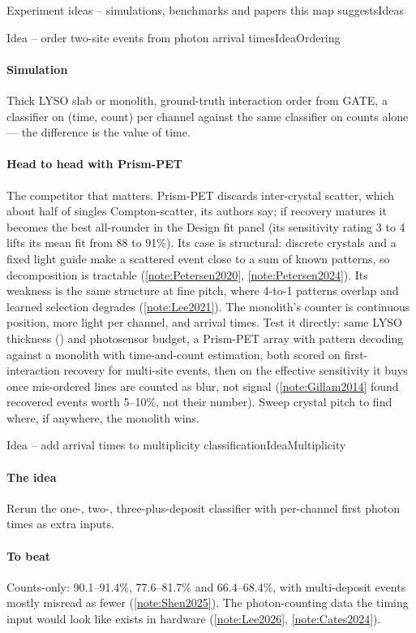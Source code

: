 \begin{programnote}{Experiment ideas -- simulations, benchmarks and papers this map suggests}{Ideas}
\begin{papernote}{Idea -- order two-site events from photon arrival times}{IdeaOrdering}
\paragraph{Simulation}
Thick LYSO slab or monolith, ground-truth interaction order from GATE, a
classifier on (time, count) per channel against the same classifier on counts
alone --- the difference is the value of time.

\paragraph{Head to head with Prism-PET}
The competitor that matters. Prism-PET discards inter-crystal scatter, which
about half of singles Compton-scatter, its authors say; if recovery matures it becomes the best
all-rounder in the Design fit panel (its sensitivity rating 3 to 4 lifts its
mean fit from 88 to 91\%). Its case is structural: discrete crystals and a
fixed light guide make a scattered event close to a sum of known patterns,
so decomposition is tractable (\ref{note:Petersen2020},
\ref{note:Petersen2024}). Its weakness is the
same structure at fine pitch, where 4-to-1 patterns overlap and learned
selection degrades (\ref{note:Lee2021}). The monolith's counter is continuous
position, more light per channel, and arrival times. Test it directly: same
LYSO thickness () and photosensor budget, a Prism-PET array with
pattern decoding against a monolith with time-and-count estimation, both
scored on first-interaction recovery for multi-site events, then on the
effective sensitivity it buys once mis-ordered lines are counted as blur, not
signal (\ref{note:Gillam2014} found recovered events worth 5--10\%, not their
number). Sweep crystal pitch to find where, if anywhere, the monolith wins.
\end{papernote}

\begin{papernote}{Idea -- add arrival times to multiplicity classification}{IdeaMultiplicity}
\paragraph{The idea}
Rerun the one-, two-, three-plus-deposit classifier with per-channel first
photon times as extra inputs.

\paragraph{To beat}
Counts-only: 90.1--91.4\%, 77.6--81.7\% and 66.4--68.4\%, with multi-deposit
events mostly misread as fewer (\ref{note:Shen2025}). The photon-counting data
the timing input would look like exists in hardware (\ref{note:Lee2026},
\ref{note:Cates2024}).


\end{papernote}
\end{programnote}
